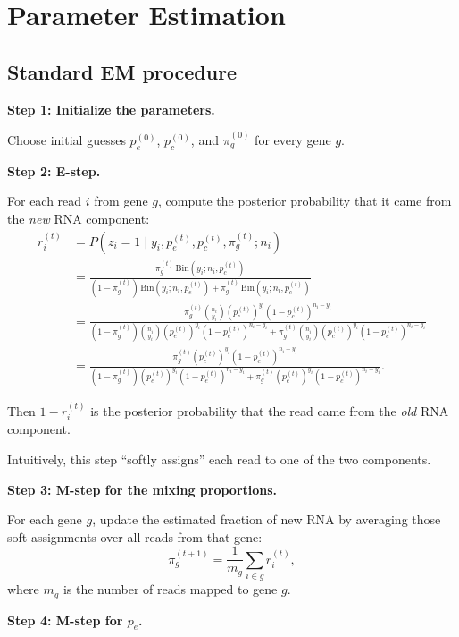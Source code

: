 \documentclass[11pt]{article}
\begin{document}
\section{Parameter Estimation}

\subsection{Standard EM procedure}

\textbf{Step 1: Initialize the parameters.}

Choose initial guesses $p_e^{(0)}$, $p_c^{(0)}$, and $\pi_g^{(0)}$ for every gene $g$.

\textbf{Step 2: E-step.}

For each read $i$ from gene $g$, compute the posterior probability that it came from the \emph{new} RNA component:
\[
\begin{aligned}
r_i^{(t)}
&=
P(z_i=1\mid y_i,p_e^{(t)},p_c^{(t)},\pi_g^{(t)}; n_i) \\
&= \frac{\pi_g^{(t)}\,\mathrm{Bin}(y_i;n_i,p_c^{(t)})}
{(1-\pi_g^{(t)})\,\mathrm{Bin}(y_i;n_i,p_e^{(t)})+\pi_g^{(t)}\,\mathrm{Bin}(y_i;n_i,p_c^{(t)})} \\
&= \frac{\pi_g^{(t)} \binom{n_i}{y_i} \left(p_c^{(t)}\right)^{y_i} \left(1 - p_c^{(t)}\right)^{n_i - y_i}}
{(1 - \pi_g^{(t)}) \binom{n_i}{y_i} \left(p_e^{(t)}\right)^{y_i} \left(1 - p_e^{(t)}\right)^{n_i - y_i} + \pi_g^{(t)} \binom{n_i}{y_i} \left(p_c^{(t)}\right)^{y_i} \left(1 - p_c^{(t)}\right)^{n_i - y_i}} \\
&= \frac{\pi_g^{(t)} \left(p_c^{(t)}\right)^{y_i} \left(1 - p_c^{(t)}\right)^{n_i - y_i}}
{(1 - \pi_g^{(t)}) \left(p_e^{(t)}\right)^{y_i} \left(1 - p_e^{(t)}\right)^{n_i - y_i} + \pi_g^{(t)} \left(p_c^{(t)}\right)^{y_i} \left(1 - p_c^{(t)}\right)^{n_i - y_i}}.
\end{aligned}
\]

Then $1-r_i^{(t)}$ is the posterior probability that the read came from the \emph{old} RNA component.

Intuitively, this step ``softly assigns'' each read to one of the two components.

\textbf{Step 3: M-step for the mixing proportions.}

For each gene $g$, update the estimated fraction of new RNA by averaging those soft assignments over all reads from that gene:
\[
\pi_g^{(t+1)}
=
\frac{1}{m_g}\sum_{i\in g} r_i^{(t)},
\]
where $m_g$ is the number of reads mapped to gene $g$.

\textbf{Step 4: M-step for $p_e$.}
\end{document}
